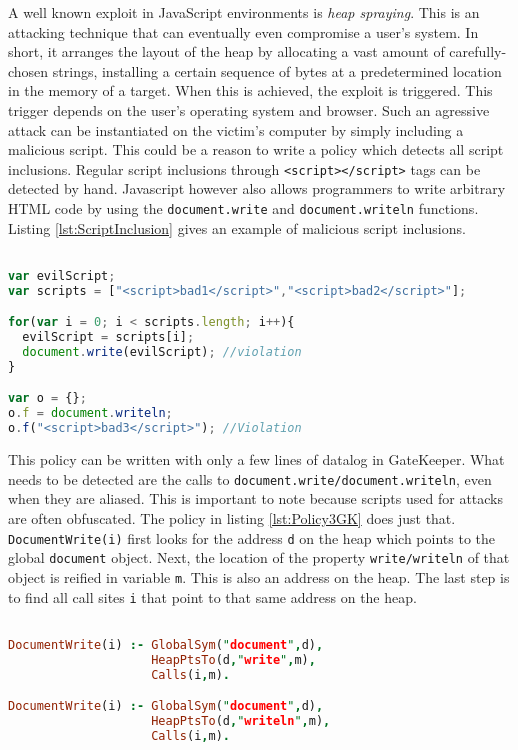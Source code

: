 A well known exploit in JavaScript environments is \textit{heap spraying}\cite{HeapSpraying}. This is an attacking technique that can eventually even compromise a user's system. In short, it arranges the layout of the heap by allocating a vast amount of carefully-chosen strings, installing a certain sequence of bytes at a predetermined location in the memory of a target. When this is achieved, the exploit is triggered. This trigger depends on the user's operating system and browser. Such an agressive attack can be instantiated on the victim's computer by simply including a malicious script. This could be a reason to write a policy which detects all script inclusions. Regular script inclusions through \texttt{<script></script>} tags can be detected by hand. Javascript however also allows programmers to write arbitrary HTML code by using the \texttt{document.write} and \texttt{document.writeln} functions. Listing \ref{lst:ScriptInclusion} gives an example of malicious script inclusions.

\begin{lstlisting}[label={lst:ScriptInclusion},language=JavaScript,caption=Script inclusion example,mathescape=true]  % float=t?

var evilScript;
var scripts = ["<script>bad1</script>","<script>bad2</script>"];

for(var i = 0; i < scripts.length; i++){
  evilScript = scripts[i];
  document.write(evilScript); //violation
}

var o = {};
o.f = document.writeln;
o.f("<script>bad3</script>"); //Violation
\end{lstlisting}

This policy can be written with only a few lines of datalog in GateKeeper. What needs to be detected are the calls to \texttt{document.write/document.writeln}, even when they are aliased. This is important to note because scripts used for attacks are often obfuscated. The policy in listing \ref{lst:Policy3GK} does just that. \texttt{DocumentWrite(i)} first looks for the address \texttt{d} on the heap which points to the global \texttt{document} object. Next, the location of the property \texttt{write/writeln} of that object is reified in variable \texttt{m}. This is also an address on the heap. The last step is to find all call sites \texttt{i} that point to that same address on the heap. 

\begin{lstlisting}[label={lst:Policy3GK},language=Prolog,caption=Policy 3 in GateKeeper,mathescape=true]  % float=t?

DocumentWrite(i) :- GlobalSym("document",d),
                    HeapPtsTo(d,"write",m),
                    Calls(i,m).

DocumentWrite(i) :- GlobalSym("document",d),
                    HeapPtsTo(d,"writeln",m),
                    Calls(i,m).
\end{lstlisting}

